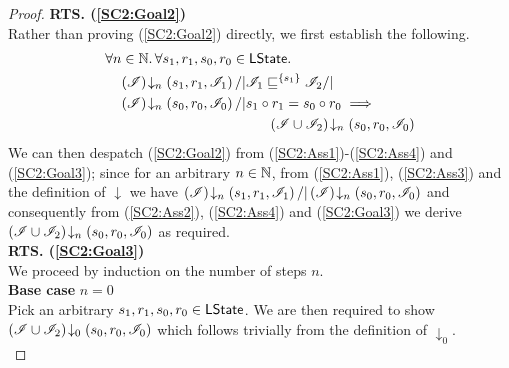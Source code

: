 \begin{lemma}
\begin{proof}
\noindent\textbf{RTS. (\ref{SC2:Goal2})} \\
Rather than proving (\ref{SC2:Goal2}) directly, we first establish the following.
%
\begin{align}
	& \for {n \in \Nats} \for{s_1, r_1, s_0, r_0 \in \LStates} \nonumber\\
	& \quad \extendsAMUpto{\lmod}{n}{s_1}{r_1}{\lmod_1} /| \lmod_1 \weakenI{\{s_1\}} \lmod_2 /| \nonumber\\
	& \quad \extendsAMUpto{\lmod}{n}{s_0}{r_0}{\lmod_0} /| s_1 \composeL r_1 = s_0 \composeL r_0 \implies \nonumber\\
	& & \hspace{-3cm}  \extendsAMUpto{\lmod \cup \lmod_2}{n}{s_0}{r_0}{\lmod_0} \label{SC2:Goal3}
\end{align}
%
We can then despatch (\ref{SC2:Goal2}) from (\ref{SC2:Ass1})-(\ref{SC2:Ass4}) and (\ref{SC2:Goal3}); since for an arbitrary $n \in \mathbb{N}$, from (\ref{SC2:Ass1}), (\ref{SC2:Ass3}) and the definition of $\downarrow$ we have $\left(\mathscr{I}\right) \!\downarrow_{n} \left(s_1, r_1, \mathscr{I}_1\right) /| \left(\mathscr{I}\right) \!\downarrow_{n} \left(s_0, r_0, \mathscr{I}_0\right)$ and consequently from (\ref{SC2:Ass2}), (\ref{SC2:Ass4}) and (\ref{SC2:Goal3}) we derive $\left(\mathscr{I} \cup \mathscr{I}_2\right) \!\downarrow_{n} \left(s_0, r_0, \mathscr{I}_0\right) $ as required. \\

\noindent\textbf{RTS. (\ref{SC2:Goal3})} \\
We proceed by induction on the number of steps $n$.\\

\noindent\textbf{Base case }$n=0$\\
Pick an arbitrary $s_1, r_1, s_0, r_0 \in \textsf{LState}$. We are then required to show	$\left(\mathscr{I} \cup \mathscr{I}_2\right) \!\downarrow_{0} \left(s_0, r_0, \mathscr{I}_0\right) $ which follows trivially from the definition of $\downarrow_0$.\\



\end{proof}
\end{lemma}

